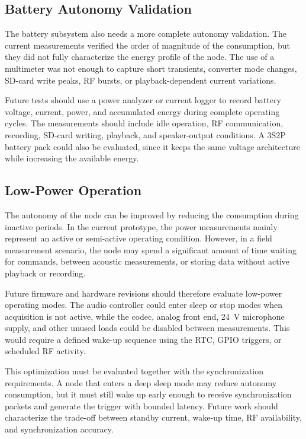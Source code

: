 \subsection{Battery Autonomy Validation}

The battery subsystem also needs a more complete autonomy validation. The current measurements verified the order of magnitude of the consumption, but they did not fully characterize the energy profile of the node. The use of a multimeter was not enough to capture short transients, converter mode changes, SD-card write peaks, RF bursts, or playback-dependent current variations.

Future tests should use a power analyzer or current logger to record battery voltage, current, power, and accumulated energy during complete operating cycles. The measurements should include idle operation, RF communication, recording, SD-card writing, playback, and speaker-output conditions. A 3S2P battery pack could also be evaluated, since it keeps the same voltage architecture while increasing the available energy.

\subsection{Low-Power Operation}

The autonomy of the node can be improved by reducing the consumption during inactive periods. In the current prototype, the power measurements mainly represent an active or semi-active operating condition. However, in a field measurement scenario, the node may spend a significant amount of time waiting for commands, between acoustic measurements, or storing data without active playback or recording.

Future firmware and hardware revisions should therefore evaluate low-power operating modes. The audio controller could enter sleep or stop modes when acquisition is not active, while the codec, analog front end, 24~V microphone supply, and other unused loads could be disabled between measurements. This would require a defined wake-up sequence using the RTC, GPIO triggers, or scheduled RF activity.

This optimization must be evaluated together with the synchronization requirements. A node that enters a deep sleep mode may reduce autonomy consumption, but it must still wake up early enough to receive synchronization packets and generate the trigger with bounded latency. Future work should characterize the trade-off between standby current, wake-up time, RF availability, and synchronization accuracy.

